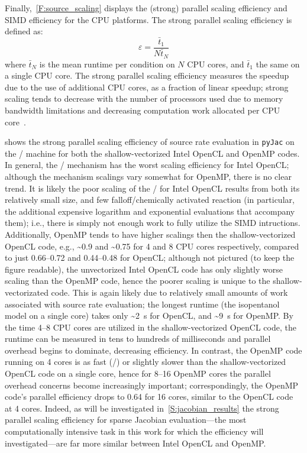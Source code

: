 \documentclass[12pt,number,sort&compress,preprint]{elsarticle}
\begin{document}
Finally,~\cref{F:source_scaling} displays the (strong) parallel scaling efficiency and SIMD efficiency for the CPU platforms.
The strong parallel scaling efficiency is defined as:
\begin{equation}
 \label{e:strong_scaling}
 \varepsilon = \frac{\bar{t}_{1}}{N \bar{t}_{N}}
\end{equation}
where $\bar{t}_{N}$ is the mean runtime per condition on $N$ CPU cores, and $\bar{t}_{1}$ the same on a single CPU core.
The strong parallel scaling efficiency measures the speedup due to the use of additional CPU cores, as a fraction of linear speedup; strong scaling tends to decrease with the number of processors used due to memory bandwidth limitations and decreasing computation work allocated per CPU core~\cite{strong_scaling}.

 shows the strong parallel scaling efficiency of source rate evaluation in \texttt{pyJac} on the \avx/ machine for both the shallow-vectorized Intel OpenCL and OpenMP codes.
In general, the \slash{} mechanism has the worst scaling efficiency for Intel OpenCL; although the mechanism scalings vary somewhat for OpenMP, there is no clear trend.
It is likely the poor scaling of the \slash{} for Intel OpenCL results from both its relatively small size, and few falloff\slash chemically activated reaction (in particular, the additional expensive logarithm and exponential evaluations that accompany them); i.e., there is simply not enough work to fully utilize the SIMD intructions.
Additionally, OpenMP tends to have higher scalings then the shallow-vectorized OpenCL code, e.g., \textasciitilde\num{0.9} and \textasciitilde\num{0.75} for \num{4} and \num{8} CPU cores respectively, compared to just \numrange{0.66}{0.72} and \numrange{0.44}{0.48} for OpenCL; although not pictured (to keep the figure readable), the unvectorized Intel OpenCL code has only slightly worse scaling than the OpenMP code, hence the poorer scaling is unique to the shallow-vectorizated code.
This is again likely due to relatively small amounts of work associated with source rate evaluation; the longest runtime (the isopentanol model on a single core) takes only \textasciitilde\SI{2}{\second} for OpenCL, and \textasciitilde\SI{9}{\second} for OpenMP.
By the time \numrange{4}{8} CPU cores are utilized in the shallow-vectorized OpenCL code, the runtime can be measured in tens to hundreds of milliseconds and parallel overhead begins to dominate, decreasing efficiency.
In contrast, the OpenMP code running on \num{4} cores is as fast (\slash{}) or slightly slower than the shallow-vectorized OpenCL code on a single core, hence for \numrange{8}{16} OpenMP cores the parallel overhead concerns become increasingly important; correspondingly, the OpenMP code's parallel efficiency drops to \num{0.64} for \num{16} cores, similar to the OpenCL code at \num{4} cores.
Indeed, as will be investigated in~\cref{S:jacobian_results} the strong parallel scaling efficiency for sparse Jacobian evaluation---the most computationally intensive task in this work for which the efficiency will investigated---are far more similar between Intel OpenCL and OpenMP.
\end{document}
